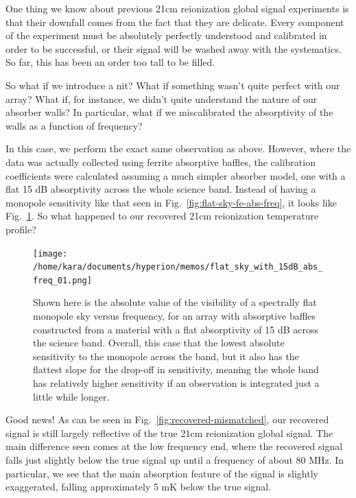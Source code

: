 One thing we know about previous 21cm reionization global signal experiments is 
that their downfall comes from the fact that they are delicate. Every component 
of the experiment must be absolutely perfectly understood and calibrated in 
order to be successful, or their signal will be washed away with the 
systematics. So far, this has been an order too tall to be filled.

So what if we introduce a nit? What if something wasn't quite perfect with our 
array? What if, for instance, we didn't quite understand the nature of our 
absorber walls? In particular, what if we miscalibrated the absorptivity of the 
walls as a function of frequency?

In this case, we perform the exact same observation as above. However, where 
the data was actually collected using ferrite absorptive baffles, the 
calibration coefficients were calculated assuming a much simpler absorber 
model, one with a flat 15 dB absorptivity across the whole science band.  
Instead of having a monopole sensitivity like that seen in 
Fig.~\ref{fig:flat-sky-fe-abs-freq}, it looks like 
Fig.~\ref{fig:flat-sky-15dB-abs-freq}. So what happened to our recovered 21cm 
reionization temperature profile?

\begin{figure}
    \begin{center}
    \texttt{[image: /home/kara/documents/hyperion/memos/flat\_sky\_with\_15dB\_abs\_freq\_01.png]}
    \end{center}
    \caption{
        Shown here is the absolute value of the visibility of a spectrally flat 
        monopole sky versus frequency, for an array with absorptive baffles 
        constructed from a material with a flat absorptivity of 15 dB across 
        the science band. Overall, this case that the lowest absolute 
        sensitivity to the monopole across the band, but it also has the 
        flattest slope for the drop-off in sensitivity, meaning the whole band 
        has relatively higher sensitivity if an observation is integrated just 
        a little while longer.
    }
    \label{fig:flat-sky-15dB-abs-freq}
\end{figure}

Good news! As can be seen in Fig.~\ref{fig:recovered-mismatched}, our recovered 
signal is still largely reflective of the true 21cm reionization global signal.  
The main difference seen comes at the low frequency end, where the recovered 
signal falls just slightly below the true signal up until a frequency of about 
80 MHz. In particular, we see that the main absorption feature of the signal is 
   slightly exaggerated, falling approximately 5 mK below the true signal.

